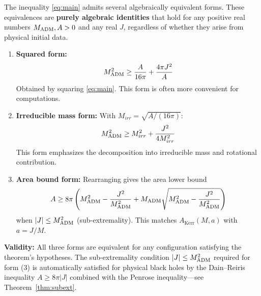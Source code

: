 \begin{remark}\label{rem:equivalent-forms}
The inequality \eqref{eq:main} admits several algebraically equivalent forms. These equivalences are \textbf{purely algebraic identities} that hold for any positive real numbers $M_{\mathrm{ADM}}, A > 0$ and any real $J$, regardless of whether they arise from physical initial data.
\begin{enumerate}[label=(\arabic*)]
    \item \textbf{Squared form:}
    \[
    M_{\mathrm{ADM}}^2 \geq \frac{A}{16\pi} + \frac{4\pi J^2}{A}
    \]
    Obtained by squaring \eqref{eq:main}. This form is often more convenient for computations.
    
    \item \textbf{Irreducible mass form:} With $M_{irr} = \sqrt{A/(16\pi)}$:
    \[
    M_{\mathrm{ADM}}^2 \geq M_{irr}^2 + \frac{J^2}{4M_{irr}^2}
    \]
    This form emphasizes the decomposition into irreducible mass and rotational contribution.
    
    \item \textbf{Area bound form:} Rearranging gives the area lower bound
    \[
    A \geq 8\pi\left(M_{\mathrm{ADM}}^2 - \frac{J^2}{M_{\mathrm{ADM}}^2} + M_{\mathrm{ADM}}\sqrt{M_{\mathrm{ADM}}^2 - \frac{J^2}{M_{\mathrm{ADM}}^2}}\right)
    \]
    when $|J| \leq M_{\mathrm{ADM}}^2$ (sub-extremality). This matches $A_{\text{Kerr}}(M, a)$ with $a = J/M$.
\end{enumerate}
\textbf{Validity:} All three forms are equivalent for any configuration satisfying the theorem's hypotheses. The sub-extremality condition $|J| \leq M_{\mathrm{ADM}}^2$ required for form (3) is automatically satisfied for physical black holes by the Dain--Reiris inequality $A \geq 8\pi|J|$ combined with the Penrose inequality---see Theorem~\ref{thm:subext}.
\end{remark}

